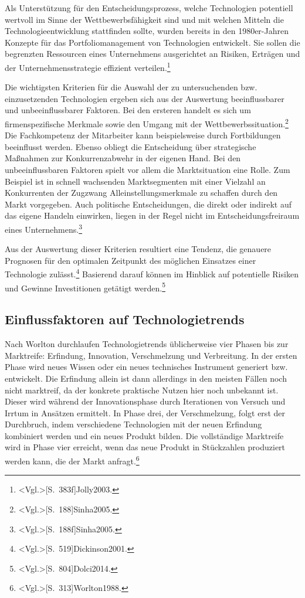 Als Unterstützung für den Entscheidungsprozess, welche Technologien potentiell wertvoll im Sinne der Wettbewerbsfähigkeit sind und mit welchen Mitteln die Technologieentwicklung stattfinden sollte, wurden bereits in den 1980er-Jahren Konzepte für das Portfoliomanagement von Technologien entwickelt. Sie sollen die begrenzten Ressourcen eines Unternehmens ausgerichtet an Risiken, Erträgen und der Unternehmensstrategie effizient verteilen.\footnote{\citeNP<Vgl.>[S.~383f]{Jolly2003}.} 

Die wichtigsten Kriterien für die Auswahl der zu untersuchenden bzw. einzusetzenden Technologien ergeben sich aus der Auswertung beeinflussbarer und unbeeinflussbarer Faktoren. Bei den ersteren handelt es sich um firmenspezifische Merkmale sowie den Umgang mit der Wettbewerbssituation.\footnote{\citeNP<Vgl.>[S.~188]{Sinha2005}.} Die Fachkompetenz der Mitarbeiter kann beispielsweise durch Fortbildungen beeinflusst werden. Ebenso obliegt die Entscheidung über strategische Maßnahmen zur Konkurrenzabwehr in der eigenen Hand. Bei den unbeeinflussbaren Faktoren spielt vor allem die Marktsituation eine Rolle. Zum Beispiel ist in schnell wachsenden Marktsegmenten mit einer Vielzahl an Konkurrenten der Zugzwang Alleinstellungsmerkmale zu schaffen durch den Markt vorgegeben. Auch politische Entscheidungen, die direkt oder indirekt auf das eigene Handeln einwirken, liegen in der Regel nicht im Entscheidungsfreiraum eines Unternehmens.\footnote{\citeNP<Vgl.>[S.~188f]{Sinha2005}.}

Aus der Auswertung dieser Kriterien resultiert eine Tendenz, die genauere Prognosen für den optimalen Zeitpunkt des möglichen Einsatzes einer Technologie zulässt.\footnote{\citeNP<Vgl.>[S.~519]{Dickinson2001}.} Basierend darauf können im Hinblick auf potentielle Risiken und Gewinne Investitionen getätigt werden.\footnote{\citeNP<Vgl.>[S.~804]{Dolci2014}.}

\subsection{Einflussfaktoren auf Technologietrends}
Nach Worlton durchlaufen Technologietrends üblicherweise vier Phasen bis zur Marktreife: Erfindung, Innovation, Verschmelzung und Verbreitung. In der ersten Phase wird neues Wissen oder ein neues technisches Instrument generiert bzw. entwickelt. Die Erfindung allein ist dann allerdings in den meisten Fällen noch nicht marktreif, da der konkrete praktische Nutzen hier noch unbekannt ist. Dieser wird während der Innovationsphase durch Iterationen von Versuch und Irrtum in Ansätzen ermittelt. In Phase drei, der Verschmelzung, folgt erst der Durchbruch, indem verschiedene Technologien mit der neuen Erfindung kombiniert werden und ein neues Produkt bilden. Die vollständige Marktreife wird in Phase vier erreicht, wenn das neue Produkt in Stückzahlen produziert werden kann, die der Markt anfragt.\footnote{\citeNP<Vgl.>[S.~313]{Worlton1988}.}

